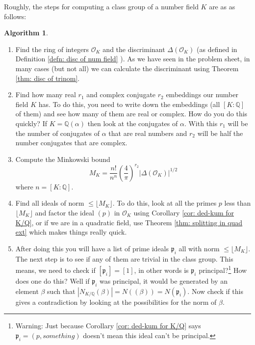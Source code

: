 \documentclass[11pt,a4paper]{report}
\theoremstyle{plain}
\theoremstyle{definition}
\theoremstyle{definition}
\newtheorem{alg}[subsection]{Algorithm}
\def\QQ{\mathbb{Q}}
\def\gothp{\mathfrak{p}}
\def \a{\alpha}
\def \OO {\mathcal{O}}
\begin{document}
	
	
	Roughly, the steps for computing a class group of a number field $K$ are as as follows:
	
	\begin{alg}
		
		
		\begin{enumerate}
			\item Find the ring of integers $\OO_K$ and the discriminant $\Delta(\OO_K)$ (as defined in Definition \ref{defn: disc of num field} ). As we have seen in the problem sheet, in many cases (but not all) we can calculate the discriminant using Theorem \ref{thm: disc of trinom}.
			
			\item Find how many real $r_1$ and complex conjugate $r_2$ embeddings our number field $K$ has. To do this, you need to write down the embeddings (all $[K:\QQ]$ of them) and see how many of them are real or complex. How do you do this quickly? If $K=\QQ(\a)$ then look at the conjugates of $\a$. With this $r_1$ will be the number of conjugates of $\a$  that are real numbers and $r_2$ will be half  the number conjugates that are complex.
			
			\item Compute the Minkowski bound \[M_K= \frac{n!}{n^n} \left( \frac{4}{\pi} \right)^{r_2} |\Delta(\OO_K)|^{1/2}\] where $n=[K:\QQ]$.
			
			
			\item Find all ideals of norm $\leq \lfloor M_K \rfloor$. To do this, look at all the primes $p$ less than $\lfloor M_K \rfloor$ and factor the ideal $(p)$ in $\OO_K$ using Corollary \ref{cor: ded-kum for K/Q}, or if we are in a quadratic field, use Theorem \ref{thm: splitting in quad ext} which makes things really quick.
			
			\item After doing this you will have a list of prime ideals $\gothp_i$ all with norm $\leq \lfloor M_K \rfloor$. The next step is to see if any of them are trivial in the class group. This means, we need to check if $[\gothp_i]=[1]$, in other words is $\gothp_i$ principal?\footnote{Warning: Just because Corollary \ref{cor: ded-kum for K/Q} says $\gothp_i=(p,something)$ doesn't mean this ideal can't be principal.} How does one do this? Well if $\gothp_i$ was principal, it would be generated by an element $\beta$ such that $|N_{K/\QQ}(\beta)|=N((\beta))=N(\gothp_i)$. Now check if this gives a contradiction by looking at the possibilities for the norm of $\beta$.
			

\end{enumerate}
\end{alg}
\end{document}
